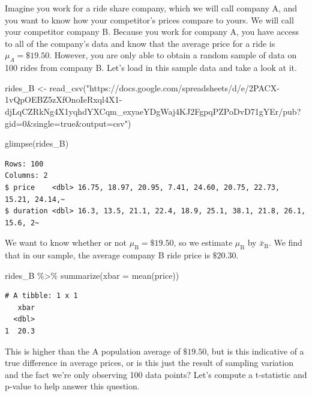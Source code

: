 \documentclass[
  letterpaper,
  DIV=11,
  numbers=noendperiod]{scrreprt}
\newenvironment{Shaded}{\begin{snugshade}}{\end{snugshade}}
\newcommand{\AttributeTok}[1]{\textcolor[rgb]{0.40,0.45,0.13}{#1}}
\newcommand{\FunctionTok}[1]{\textcolor[rgb]{0.28,0.35,0.67}{#1}}
\newcommand{\NormalTok}[1]{\textcolor[rgb]{0.00,0.23,0.31}{#1}}
\newcommand{\OtherTok}[1]{\textcolor[rgb]{0.00,0.23,0.31}{#1}}
\newcommand{\SpecialCharTok}[1]{\textcolor[rgb]{0.37,0.37,0.37}{#1}}
\newcommand{\StringTok}[1]{\textcolor[rgb]{0.13,0.47,0.30}{#1}}
\theoremstyle{definition}
\theoremstyle{remark}
\begin{document}
Imagine you work for a ride share company, which we will call company A,
and you want to know how your competitor's prices compare to yours. We
will call your competitor company B. Because you work for company A, you
have access to all of the company's data and know that the average price
for a ride is \(\mu_A = \$19.50\). However, you are only able to obtain
a random sample of data on 100 rides from company B. Let's load in this
sample data and take a look at it.

\begin{Shaded}
\begin{Highlighting}[]
\NormalTok{rides\_B }\OtherTok{\textless{}{-}} \FunctionTok{read\_csv}\NormalTok{(}\StringTok{"https://docs.google.com/spreadsheets/d/e/2PACX{-}1vQpOEBZ5zXfOnoIeRxql4X1{-}djLqCZRkNg4X1yqhdYXCqm\_exyaeYDgWaj4KJ2FgpqPZPoDvD71gYEr/pub?gid=0\&single=true\&output=csv"}\NormalTok{)}

\FunctionTok{glimpse}\NormalTok{(rides\_B)}
\end{Highlighting}
\end{Shaded}

\begin{verbatim}
Rows: 100
Columns: 2
$ price    <dbl> 16.75, 18.97, 20.95, 7.41, 24.60, 20.75, 22.73, 15.21, 24.14,~
$ duration <dbl> 16.3, 13.5, 21.1, 22.4, 18.9, 25.1, 38.1, 21.8, 26.1, 15.6, 2~
\end{verbatim}

We want to know whether or not \(\mu_{\text{B}} = \$19.50\), so we
estimate \(\mu_{\text{B}}\) by \(\bar{x}_{\text{B}}\). We find that in
our sample, the average company B ride price is \(\$20.30\).

\begin{Shaded}
\begin{Highlighting}[]
\NormalTok{rides\_B }\SpecialCharTok{\%\textgreater{}\%} 
  \FunctionTok{summarize}\NormalTok{(}\AttributeTok{xbar =} \FunctionTok{mean}\NormalTok{(price))}
\end{Highlighting}
\end{Shaded}

\begin{verbatim}
# A tibble: 1 x 1
   xbar
  <dbl>
1  20.3
\end{verbatim}

This is higher than the A population average of \(\$19.50\), but is this
indicative of a true difference in average prices, or is this just the
result of sampling variation and the fact we're only observing 100 data
points? Let's compute a t-statistic and p-value to help answer this
question.
\end{document}

